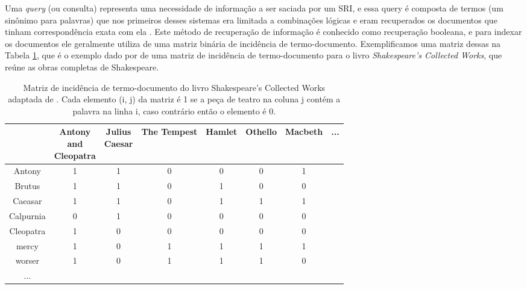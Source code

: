Uma \textit{query} (ou consulta) representa uma necessidade de informação a ser saciada por um SRI, e essa query é composta de termos (um sinônimo para palavras) que nos primeiros desses sistemas era limitada a combinações lógicas e eram recuperados os documentos que tinham correspondência exata com ela \cite[p.~1446]{Sanderson2012THIRR}. 
Este método de recuperação de informação é conhecido como recuperação booleana, e para indexar os documentos ele geralmente utiliza de uma matriz binária de incidência de termo-documento. 
Exemplificamos uma matriz dessas na Tabela \ref{tab:matriz-incidência-termo-documento}, que é o exemplo dado por  de uma matriz de incidência de termo-documento para o livro \textit{Shakespeare’s Collected Works}, que reúne as obras completas de Shakespeare.

\begin{table}[]
    \centering
    \begin{tabular}{|c|c|c|c|c|c|c|c}\hline
         \diagbox{Palavra}{\raisebox{-1.27cm}{\rotatebox{90}{\parbox{1.6cm}{\centering Peça \\ de teatro}}}} & \makecell{Antony \\ and \\ Cleopatra} & \makecell{Julius \\ Caesar} & The Tempest & Hamlet & Othello & Macbeth & ... \\ \hline
         Antony     & 1 & 1 & 0 & 0 & 0 & 1 & \\
         Brutus     & 1 & 1 & 0 & 1 & 0 & 0 & \\
         Caeasar    & 1 & 1 & 0 & 1 & 1 & 1 & \\
         Calpurnia  & 0 & 1 & 0 & 0 & 0 & 0 & \\
         Cleopatra  & 1 & 0 & 0 & 0 & 0 & 0 & \\
         mercy      & 1 & 0 & 1 & 1 & 1 & 1 & \\
         worser     & 1 & 0 & 1 & 1 & 1 & 0 & \\
         ...        & & & & & & & 
    \end{tabular}
    \caption{Matriz de incidência de termo-documento do livro Shakespeare’s Collected Works adaptada de . Cada elemento (i, j) da matriz é 1 se a peça de teatro na coluna j contém a palavra na linha i, caso contrário então o elemento é 0.}
    \label{tab:matriz-incidência-termo-documento}
\end{table}


